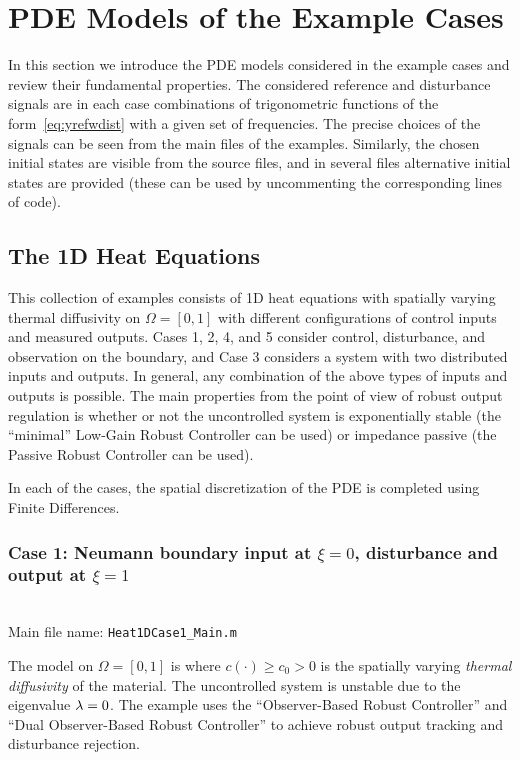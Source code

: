 \documentclass[11pt, a4paper]{amsart}
\theoremstyle{definition}
\numberwithin{equation}{section}
\newcommand{\wdist}{w_{\mbox{\scriptsize\textit{dist}}}}
\begin{document}
\section{PDE Models of the Example Cases}
\label{sec:PDEcases}

In this section we introduce the PDE models considered in the example cases and review their fundamental properties.
The considered reference and disturbance signals are in each case combinations of trigonometric functions of the form~\eqref{eq:yrefwdist} with a given set of frequencies. The precise choices of the signals can be seen from the main files of the examples. Similarly, the chosen initial states are visible from the source files, and in several files alternative initial states are provided (these can be used by uncommenting the corresponding lines of code).

\subsection{The 1D Heat Equations}

This collection of examples consists of 1D heat equations with spatially varying thermal diffusivity on $\Omega = [0,1]$ with different configurations of control inputs and measured outputs. Cases 1, 2, 4, and 5 consider control, disturbance, and observation on the boundary, and Case 3 considers a system with two distributed inputs and outputs. In general, any combination of the above types of inputs and outputs is possible. 
The main properties from the point of view of robust output regulation is whether or not the uncontrolled system is exponentially stable (the ``minimal'' Low-Gain Robust Controller can be used) or impedance passive (the Passive Robust Controller can be used).

In each of the cases, the spatial discretization of the PDE is completed using Finite Differences.

\medskip

\subsubsection*{Case 1: Neumann boundary input at $\xi = 0$, disturbance and output at $\xi = 1$}
~\\[-1ex]

  \noindent Main file name: \texttt{Heat1DCase1\_Main.m}

\medskip

The model on $\Omega = [0,1]$ is
\eq{
  \pd{x}{t}(\xi,t) &=  \pdb{\xi}(c(\xi)\pd{x}{\xi})(\xi,t), \qquad x(\xi,0)=x_0(\xi) \\
      -\pd{x}{\xi}(0,t) &= u(t), \qquad 
      \pd{x}{\xi}(1,t) = \wdist(t), \\
      y(t) &= x(1,t),
    }
    where $c(\cdot)\geq c_0>0$ is the spatially varying \textit{thermal diffusivity} of the material.
    The uncontrolled system is unstable due to the eigenvalue $\lambda=0$. 
The example uses the ``Observer-Based Robust Controller'' and ``Dual Observer-Based Robust Controller'' to achieve robust output tracking and disturbance rejection.
\end{document}
